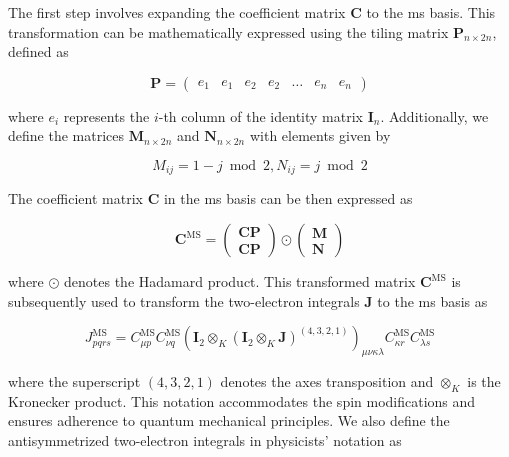 The first step involves expanding the coefficient matrix \(\mathbf{C}\) to the \acrshort{ms} basis. This transformation can be mathematically expressed using the tiling matrix \(\mathbf{P}_{n\times 2n}\), defined as

\begin{equation}
\mathbf{P}=
\begin{pmatrix}
e_1&e_1&e_2&e_2&\dots&e_n&e_n
\end{pmatrix}
\end{equation}

where \(e_i\) represents the \(i\)-th column of the identity matrix \(\mathbf{I}_n\). Additionally, we define the matrices \(\mathbf{M}_{n\times 2n}\) and \(\mathbf{N}_{n\times 2n}\) with elements given by

\begin{equation}
M_{ij}=1-j\bmod 2,N_{ij}=j \bmod 2
\end{equation}

The coefficient matrix \(\mathbf{C}\) in the \acrshort{ms} basis can be then expressed as

\begin{equation}
\mathbf{C}^{\mathrm{MS}}=
\begin{pmatrix}
\mathbf{CP} \\
\mathbf{CP}
\end{pmatrix}
\odot
\begin{pmatrix}
\mathbf{M} \\
\mathbf{N}
\end{pmatrix}
\end{equation}

where \(\odot\) denotes the Hadamard product. This transformed matrix \(\mathbf{C}^{\mathrm{MS}}\) is subsequently used to transform the two-electron integrals \(\mathbf{J}\) to the \acrshort{ms} basis as

\begin{equation}
J_{pqrs}^{\mathrm{MS}}=C_{\mu p}^{\mathrm{MS}}C_{\nu q}^{\mathrm{MS}}(\mathbf{I}_{2}\otimes_K(\mathbf{I}_{2}\otimes_K\mathbf{J})^{(4,3,2,1)})_{\mu\nu\kappa\lambda}C_{\kappa r}^{\mathrm{MS}}C_{\lambda s}^{\mathrm{MS}}
\end{equation}

where the superscript \((4,3,2,1)\) denotes the axes transposition and \(\otimes_K\) is the Kronecker product. This notation accommodates the spin modifications and ensures adherence to quantum mechanical principles. We also define the antisymmetrized two-electron integrals in physicists' notation as

